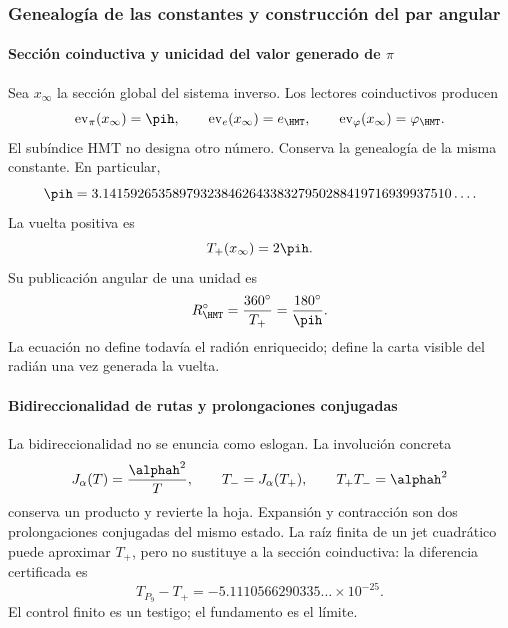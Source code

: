 
\subsubsection{Genealogía de las constantes y construcción del par angular}

\paragraph{Sección coinductiva y unicidad del valor generado de \(\pi\)}

Sea \(x_\infty\) la sección global del sistema inverso. Los lectores
coinductivos producen
\[
\operatorname{ev}_\pi(x_\infty)=\pih,\qquad
\operatorname{ev}_e(x_\infty)=e_{\HMT},\qquad
\operatorname{ev}_\varphi(x_\infty)=\varphi_{\HMT}.
\]
El subíndice HMT no designa otro número. Conserva la genealogía de la misma
constante. En particular,
\[
\pih=3.14159265358979323846264338327950288419716939937510\ldots.
\]
La vuelta positiva es
\begin{equation}
T_+(x_\infty)=2\pih.
\label{eq:vuelta-plus}
\end{equation}
Su publicación angular de una unidad es
\begin{equation}
R_{\HMT}^{\circ}=\frac{360^\circ}{T_+}=\frac{180^\circ}{\pih}.
\label{eq:radian-publicado}
\end{equation}
La ecuación no define todavía el radión enriquecido; define la carta visible
del radián una vez generada la vuelta.

\paragraph{Bidireccionalidad de rutas y prolongaciones conjugadas}

La bidireccionalidad no se enuncia como eslogan. La involución concreta
\begin{equation}
J_\alpha(T)=\frac{\alphah^2}{T},\qquad
T_-=J_\alpha(T_+),\qquad T_+T_-=\alphah^2
\label{eq:bidireccional-turn}
\end{equation}
conserva un producto y revierte la hoja. Expansión y contracción son dos
prolongaciones conjugadas del mismo estado. La raíz finita de un jet
cuadrático puede aproximar \(T_+\), pero no sustituye a la sección
coinductiva: la diferencia certificada es
\[
T_{P_9}-T_+=-5.1110566290335\ldots\times10^{-25}.
\]
El control finito es un testigo; el fundamento es el límite.

